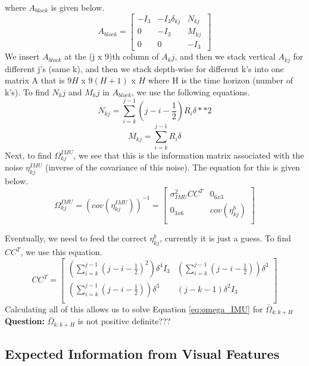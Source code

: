where $A_{block}$ is given below.
\[A_{block} = 
\begin{bmatrix}
-I_3 & -I_3\delta_{kj} & N_{kj} \\
0 & -I_3 & M_{kj} \\
0 & 0 & -I_3 \
\end{bmatrix}\]
We insert $A_{block}$ at the (j x 9)th column of $A_kj$, and then we stack vertical $A_{kj}$ for different j's (same k), and then we stack depth-wise for different k's into one matrix A that is $9H$ x $9(H+1)$ x $H$ where H is the time horizon (number of k's). To find $N_kj$ and $M_kj$ in $A_{block}$, we use the following equations. 
\begin{equation}
    N_{kj} = \sum_{i=k}^{j-1}(j-i-\frac{1}{2})R_i\delta**2
\end{equation}
\begin{equation}
    M_{kj} = \sum_{i=k}^{j-1}R_i\delta
\end{equation}
Next, to find $\Omega_{kj}^{IMU}$, we see that this is the information matrix associated with the noise $\eta_{kj}^{IMU}$ (inverse of the covariance of this noise). The equation for this is given below. 
\[\Omega_{kj}^{IMU} = (cov(\eta_{kj}^{IMU}))^{-1} =
\begin{bmatrix}
\sigma_{IMU}^2CC^T & 0_{6x3} \\
0_{3x6} & cov(\eta_{kj}^b) \\
\end{bmatrix}
\]

Eventually, we need to feed the correct $\eta_{kj}^b$, currently it is just a guess. To find $CC^T$, we use this equation.
\[CC^T =
\begin{bmatrix}
(\sum_{i=k}^{j-1}(j-i-\frac{1}{2})^2)\delta^4 I_3 & (\sum_{i=k}^{j-1}(j-i-\frac{1}{2}))\delta^3 \\
(\sum_{i=k}^{j-1}(j-i-\frac{1}{2}))\delta^3  &
(j-k-1)\delta^2I_3 \\
\end{bmatrix}
\]
Calculating all of this allows us to solve Equation \ref{eq:omega_IMU} for $\bar{\Omega}_{k:k+H}$ \\
\textbf{Question: } $\bar{\Omega}_{k:k+H}$ is not positive definite???

\subsection{Expected Information from Visual Features}\label{sub:info_features}

